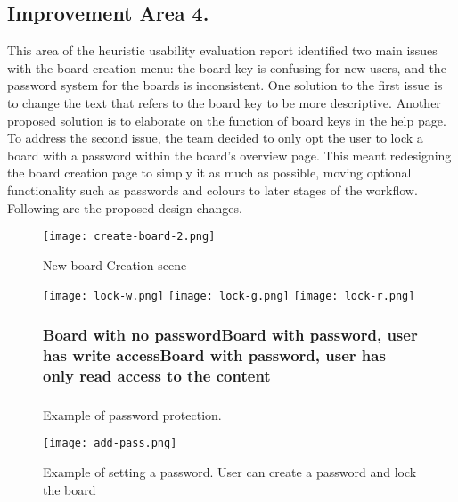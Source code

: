 \subsection*{Improvement Area 4.}
\indent This area of the heuristic usability evaluation report identified two main issues with the board creation menu: the board key is confusing for new users, and the password system for the boards is inconsistent.
\newline
\indent One solution to the first issue is to change the text that refers to the board key to be more descriptive. Another proposed solution is to elaborate on the function of board keys in the help page.
\newline
\indent To address the second issue, the team decided to only opt the user to lock a board with a password within the board's overview page. This meant redesigning the board creation page to simply it as much as possible, moving optional functionality such as passwords and colours to later stages of the workflow.
\newline\indent
Following are the proposed design changes.
\begin{figure}[H]
    \centering
    \texttt{[image: create-board-2.png]}
    \caption{New board Creation scene}
    \label{fig:board-create}
\end{figure}

\begin{figure}[H]
    \centering
    \texttt{[image: lock-w.png]}
    \texttt{[image: lock-g.png]}
    \texttt{[image: lock-r.png]}
    \caption{Example of password protection.}
    \subsubsection*{Board with no password\newline Board with password, user has write access\newline Board with password, user has only read access to the content}
    \subsubsection*{}
    \label{fig:lock}
\end{figure}

\begin{figure}[H]
    \centering
    \texttt{[image: add-pass.png]}
    \caption{Example of setting a password. User can create a password and lock the board}
    \label{fig:set-pass}
\end{figure}

